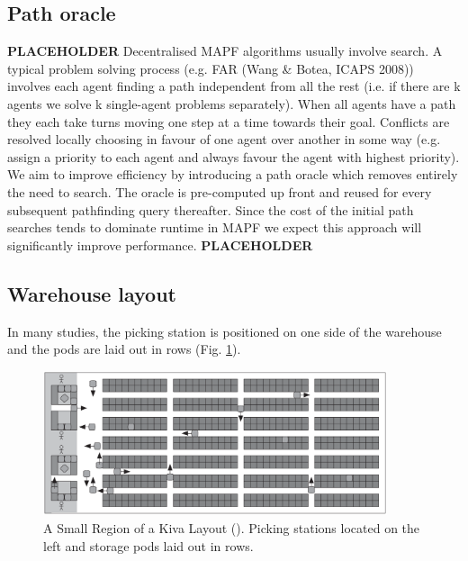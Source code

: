 \documentclass[a4paper,11pt]{article}
\begin{document}
\label{Research}
\subsection{Path oracle}

\cite{strasser2015compressing}


\noindent \textbf{PLACEHOLDER} Decentralised MAPF algorithms usually involve search. A typical problem solving process (e.g. FAR (Wang \& Botea, ICAPS 2008)) involves each agent finding a path independent from all the rest (i.e. if there are k agents we solve k single-agent problems separately). When all agents have a path they each take turns moving one step at a time towards their goal. Conflicts are resolved locally choosing in favour of one agent over another in some way (e.g. assign a priority to each agent and always favour the agent with highest priority). We aim to improve efficiency by introducing a path oracle which removes entirely the need to search. The oracle is pre-computed up front and reused for every subsequent pathfinding query thereafter. Since the cost of the initial path searches tends to dominate runtime in MAPF we expect this approach will significantly improve performance. \textbf{PLACEHOLDER}

\subsection{Warehouse layout}
In many studies, the picking station is positioned on one side of the warehouse and the pods are laid out in rows (Fig. \ref{kivalayout1}).

\begin{figure}[h]
	\centering
	\includegraphics[width=0.9\textwidth]{kivasystemlayout}
	\caption{A Small Region of a Kiva Layout (\cite{wurman2008coordinating}). Picking stations located on the left and storage pods laid out in rows.}
	\label{kivalayout1}
\end{figure}
\end{document}
